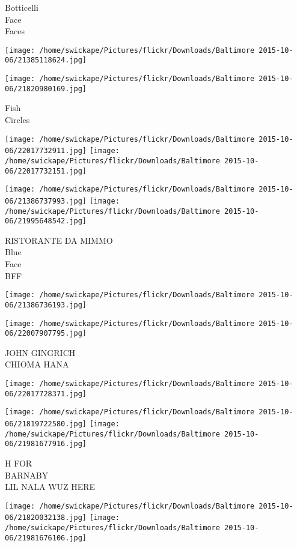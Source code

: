 \documentclass[10pt,letterpaper]{article}
\begin{document}
Botticelli\\
Face\\
Faces
\pagebreak

\texttt{[image: /home/swickape/Pictures/flickr/Downloads/Baltimore 2015-10-06/21385118624.jpg]}

\vspace{0.25in}
\texttt{[image: /home/swickape/Pictures/flickr/Downloads/Baltimore 2015-10-06/21820980169.jpg]}

Fish\\
Circles
\pagebreak

\texttt{[image: /home/swickape/Pictures/flickr/Downloads/Baltimore 2015-10-06/22017732911.jpg]}
\texttt{[image: /home/swickape/Pictures/flickr/Downloads/Baltimore 2015-10-06/22017732151.jpg]}

\texttt{[image: /home/swickape/Pictures/flickr/Downloads/Baltimore 2015-10-06/21386737993.jpg]}
\texttt{[image: /home/swickape/Pictures/flickr/Downloads/Baltimore 2015-10-06/21995648542.jpg]}

RISTORANTE DA MIMMO\\
Blue\\
Face\\
BFF
\pagebreak

\texttt{[image: /home/swickape/Pictures/flickr/Downloads/Baltimore 2015-10-06/21386736193.jpg]}

\vspace{0.25in}
\texttt{[image: /home/swickape/Pictures/flickr/Downloads/Baltimore 2015-10-06/22007907795.jpg]}

JOHN GINGRICH\\
CHIOMA HANA
\pagebreak

\texttt{[image: /home/swickape/Pictures/flickr/Downloads/Baltimore 2015-10-06/22017728371.jpg]}

\vspace{0.25in}
\texttt{[image: /home/swickape/Pictures/flickr/Downloads/Baltimore 2015-10-06/21819722580.jpg]}
\texttt{[image: /home/swickape/Pictures/flickr/Downloads/Baltimore 2015-10-06/21981677916.jpg]}

H FOR\\
BARNABY\\
LIL NALA WUZ HERE
\pagebreak

\texttt{[image: /home/swickape/Pictures/flickr/Downloads/Baltimore 2015-10-06/21820032138.jpg]}
\texttt{[image: /home/swickape/Pictures/flickr/Downloads/Baltimore 2015-10-06/21981676106.jpg]}
\end{document}
